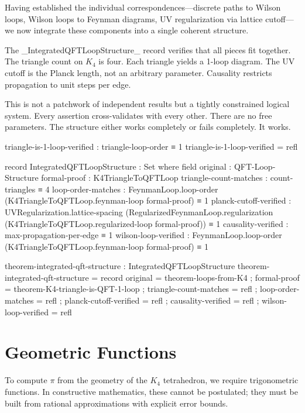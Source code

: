 \documentclass[11pt,a4paper]{book}
\begin{document}
Having established the individual correspondences---discrete paths to Wilson loops, Wilson loops to Feynman diagrams, UV regularization via lattice cutoff---we now integrate these components into a single coherent structure.

The \_IntegratedQFTLoopStructure\_ record verifies that all pieces fit together.
The triangle count on $K_4$ is four. Each triangle yields a 1-loop diagram. The UV cutoff is the Planck length, not an arbitrary parameter. Causality restricts propagation to unit steps per edge.

This is not a patchwork of independent results but a tightly constrained logical system.
Every assertion cross-validates with every other. There are no free parameters. The structure either works completely or fails completely.
It works.

\begin{code}
triangle-is-1-loop-verified : triangle-loop-order ≡ 1
triangle-is-1-loop-verified = refl

record IntegratedQFTLoopStructure : Set where
  field
    original : QFT-Loop-Structure
    formal-proof : K4TriangleToQFTLoop
    triangle-count-matches : count-triangles ≡ 4
    loop-order-matches : FeynmanLoop.loop-order (K4TriangleToQFTLoop.feynman-loop formal-proof) ≡ 1
    planck-cutoff-verified : UVRegularization.lattice-spacing 
                           (RegularizedFeynmanLoop.regularization 
                             (K4TriangleToQFTLoop.regularized-loop formal-proof)) ≡ 1
    causality-verified : max-propagation-per-edge ≡ 1
    wilson-loop-verified : FeynmanLoop.loop-order (K4TriangleToQFTLoop.feynman-loop formal-proof) ≡ 1

theorem-integrated-qft-structure : IntegratedQFTLoopStructure
theorem-integrated-qft-structure = record
  { original = theorem-loops-from-K4
  ; formal-proof = theorem-K4-triangle-is-QFT-1-loop
  ; triangle-count-matches = refl
  ; loop-order-matches = refl
  ; planck-cutoff-verified = refl
  ; causality-verified = refl
  ; wilson-loop-verified = refl
  }
\end{code}

\chapter{Geometric Functions}
\label{chap:geometric-functions}

To compute $\pi$ from the geometry of the $K_4$ tetrahedron, we require trigonometric functions. In constructive mathematics, these cannot be postulated; they must be built from rational approximations with explicit error bounds.
\end{document}
